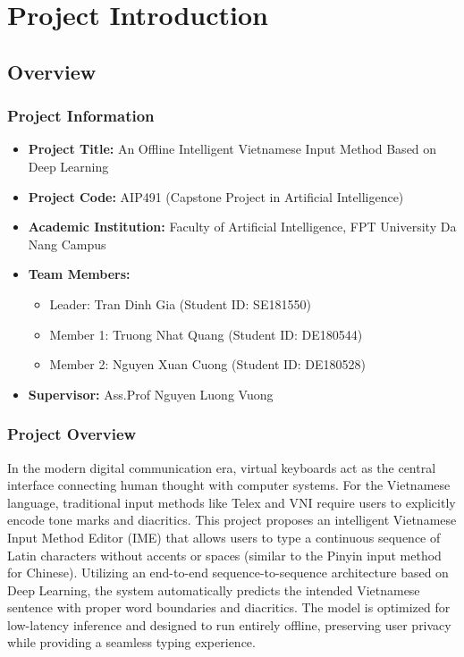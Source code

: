 \chapter{Project Introduction}\label{chapter:intro}

\section{Overview}

\subsection{Project Information}
\begin{itemize}[leftmargin=1.5cm]
    \item \textbf{Project Title:} An Offline Intelligent Vietnamese Input Method Based on Deep Learning
    \item \textbf{Project Code:} AIP491 (Capstone Project in Artificial Intelligence)
    \item \textbf{Academic Institution:} Faculty of Artificial Intelligence, FPT University Da Nang Campus
    \item \textbf{Team Members:}
    \begin{itemize}
        \item Leader: Tran Dinh Gia (Student ID: SE181550)
        \item Member 1: Truong Nhat Quang (Student ID: DE180544)
        \item Member 2: Nguyen Xuan Cuong (Student ID: DE180528)
    \end{itemize}
    \item \textbf{Supervisor:} Ass.Prof Nguyen Luong Vuong
\end{itemize}

\subsection{Project Overview}
In the modern digital communication era, virtual keyboards act as the central interface connecting human thought with computer systems. For the Vietnamese language, traditional input methods like Telex and VNI require users to explicitly encode tone marks and diacritics. This project proposes an intelligent Vietnamese Input Method Editor (IME) that allows users to type a continuous sequence of Latin characters without accents or spaces (similar to the Pinyin input method for Chinese). Utilizing an end-to-end sequence-to-sequence architecture based on Deep Learning, the system automatically predicts the intended Vietnamese sentence with proper word boundaries and diacritics. The model is optimized for low-latency inference and designed to run entirely offline, preserving user privacy while providing a seamless typing experience.

